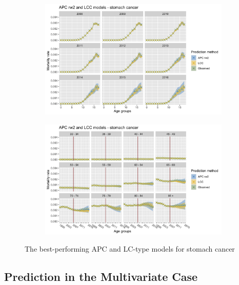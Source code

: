 \begin{figure}[h!]
    \centering
    \begin{subfigure}[b]{.45\linewidth}
        \includegraphics[width=\linewidth]{real-data/real-data-univariate/Figures/univariate-comparison-by-age-stomach.png}
    \end{subfigure}
    \begin{subfigure}[b]{.45\linewidth}
        \includegraphics[width=\linewidth]{real-data/real-data-univariate/Figures/univariate-comparison-by-period-stomach.png}
    \end{subfigure}
    \caption{The best-performing APC and LC-type models for stomach cancer}
    \label{fig:uv-comparison-stomach}
\end{figure}

\newpage
\subsection{Prediction in the Multivariate Case}

